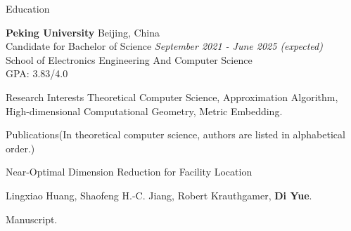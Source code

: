 \documentclass{resume} %
\begin{document}

\begin{rSection}{Education}

{\bf Peking University} \hfill {Beijing, China} 
\\ Candidate for Bachelor of Science \hfill {\em September 2021 - June 2025 (expected)}
\\ School of Electronics Engineering And Computer Science
\\ GPA: 3.83/4.0



\end{rSection}

\begin{rSection}{Research Interests}{}
Theoretical Computer Science, Approximation Algorithm, High-dimensional Computational Geometry, Metric Embedding.
\end{rSection}

\begin{rSection}{Publications}{(In theoretical computer science, authors are listed in alphabetical order.)}

    \begin{pubSubsection}{Near-Optimal Dimension Reduction for Facility Location}
        \item Lingxiao Huang, Shaofeng H.-C. Jiang, Robert Krauthgamer, \textbf{Di Yue}.
        \item Manuscript.%
    \end{pubSubsection}
\end{rSection}
\end{document}
